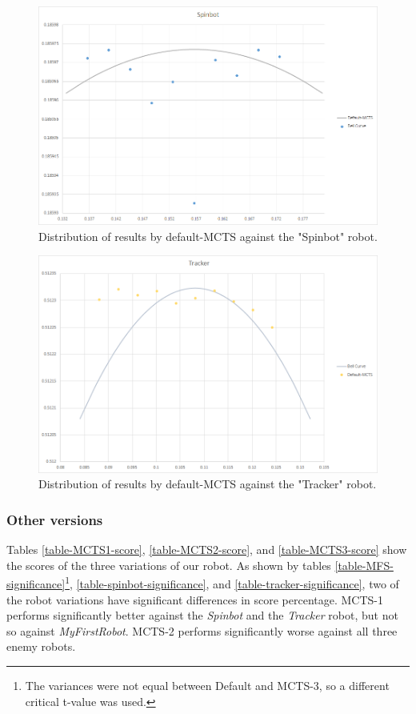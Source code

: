 \begin{figure}[htp]
\centerline{\includegraphics[width=\columnwidth]{Images/SpinbotDistribution}}
\caption{Distribution of results by default-MCTS against the "Spinbot" robot.}
\label{figure--Distribution-Spinbot}
\end{figure}

\begin{figure}[htp]
\centerline{\includegraphics[width=\columnwidth]{Images/TrackerDistribution}}
\caption{Distribution of results by default-MCTS against the "Tracker" robot.}
\label{figure--Distribution-Tracker}
\end{figure}

\subsubsection{Other versions}
Tables \ref{table-MCTS1-score}, \ref{table-MCTS2-score}, and \ref{table-MCTS3-score} show the scores of the three variations of our robot. As shown by tables \ref{table-MFS-significance}\footnote{The variances were not equal between Default and MCTS-3, so a different critical t-value was used.}, \ref{table-spinbot-significance}, and \ref{table-tracker-significance}, two of the robot variations have significant differences in score percentage. MCTS-1 performs significantly better against the \textit{Spinbot} and the \textit{Tracker} robot, but not so against \textit{MyFirstRobot}. MCTS-2 performs significantly worse against all three enemy robots.

